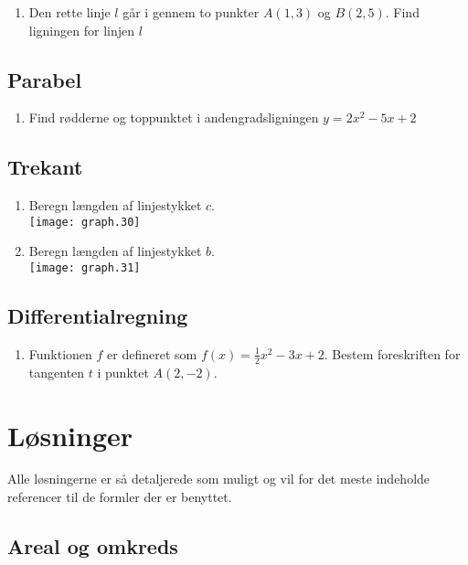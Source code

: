 \documentclass[11pt,a5paper,fleqn,leqno]{book}
\begin{document}
\begin{enumerate}
\item \label{op:linje_1} Den rette linje $l$ går i gennem to punkter $A(1,3)$ og $B(2,5)$. Find ligningen for linjen $l$
\end{enumerate}

\section{Parabel}

\begin{enumerate}
\item \label{op:parabel_1} Find rødderne og toppunktet i andengradsligningen $y = 2x^2 - 5x + 2$
\end{enumerate}

\section{Trekant}

\begin{enumerate}
\item \label{op:trekant_1}
Beregn længden af linjestykket $c$. \\
\texttt{[image: graph.30]}
\item \label{op:trekant_2}
Beregn længden af linjestykket $b$. \\
\texttt{[image: graph.31]}
\end{enumerate}

\section{Differentialregning}

\begin{enumerate}
\item \label{op:diff_1} Funktionen $f$ er defineret som $f(x) = \frac{1}{2}x^2 - 3x + 2$. Bestem foreskriften for tangenten $t$ i punktet $A(2,-2)$.
\end{enumerate}

\chapter{Løsninger} \label{ch:Loesninger}

Alle løsningerne er så detaljerede som muligt og vil for det meste indeholde referencer til de formler der er benyttet.

\newpage

\section{Areal og omkreds}
\end{document}
